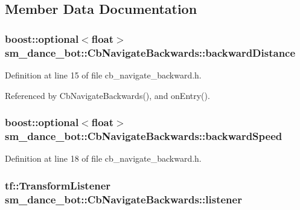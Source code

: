 \subsection{Member Data Documentation}
\subsubsection[{\texorpdfstring{backward\+Distance}{backwardDistance}}]{\setlength{\rightskip}{0pt plus 5cm}boost\+::optional$<$float$>$ sm\+\_\+dance\+\_\+bot\+::\+Cb\+Navigate\+Backwards\+::backward\+Distance}\hypertarget{classsm__dance__bot_1_1CbNavigateBackwards_ad5b1a7d85676aefa31f966baf61b6378}{}\label{classsm__dance__bot_1_1CbNavigateBackwards_ad5b1a7d85676aefa31f966baf61b6378}


Definition at line 15 of file cb\+\_\+navigate\+\_\+backward.\+h.



Referenced by Cb\+Navigate\+Backwards(), and on\+Entry().

\subsubsection[{\texorpdfstring{backward\+Speed}{backwardSpeed}}]{\setlength{\rightskip}{0pt plus 5cm}boost\+::optional$<$float$>$ sm\+\_\+dance\+\_\+bot\+::\+Cb\+Navigate\+Backwards\+::backward\+Speed}\hypertarget{classsm__dance__bot_1_1CbNavigateBackwards_ac61b513376e38ae6eb3eb9c9ebf1dd8e}{}\label{classsm__dance__bot_1_1CbNavigateBackwards_ac61b513376e38ae6eb3eb9c9ebf1dd8e}


Definition at line 18 of file cb\+\_\+navigate\+\_\+backward.\+h.

\subsubsection[{\texorpdfstring{listener}{listener}}]{\setlength{\rightskip}{0pt plus 5cm}tf\+::\+Transform\+Listener sm\+\_\+dance\+\_\+bot\+::\+Cb\+Navigate\+Backwards\+::listener}\hypertarget{classsm__dance__bot_1_1CbNavigateBackwards_a4ec9af0d5b94c5e0654a768c36bec85b}{}\label{classsm__dance__bot_1_1CbNavigateBackwards_a4ec9af0d5b94c5e0654a768c36bec85b}


